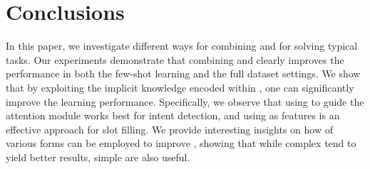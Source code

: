 \section{Conclusions}
In this paper, we investigate different ways for combining \NNs and \REs for solving typical \SLU tasks. Our experiments demonstrate that
combining \NNs and \REs clearly improves the \NN performance in both the few-shot learning and the  full dataset settings. We show that by
exploiting the implicit knowledge encoded within \REs, one can significantly improve the learning performance. Specifically, we observe
that using \REs to guide the attention module works best for intent detection, and using \REtags as features is an effective approach for
slot filling. We provide interesting insights on how \REs of various forms can be employed to improve \NNs, showing that while complex \REs
tend to yield better results, simple \REs are also useful.

